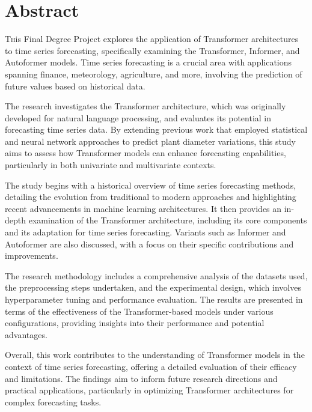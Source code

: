 

\chapter*{Abstract}
\pagestyle{especial}
{}

\lettrine[lraise=-0.1, lines=2, loversize=0.2]{T}{h}is Final Degree Project explores the application of Transformer architectures to time series forecasting, specifically examining the Transformer, Informer, and Autoformer models. Time series forecasting is a crucial area with applications spanning finance, meteorology, agriculture, and more, involving the prediction of future values based on historical data.

The research investigates the Transformer architecture, which was originally developed for natural language processing, and evaluates its potential in forecasting time series data. By extending previous work that employed statistical and neural network approaches to predict plant diameter variations, this study aims to assess how Transformer models can enhance forecasting capabilities, particularly in both univariate and multivariate contexts.

The study begins with a historical overview of time series forecasting methods, detailing the evolution from traditional to modern approaches and highlighting recent advancements in machine learning architectures. It then provides an in-depth examination of the Transformer architecture, including its core components and its adaptation for time series forecasting. Variants such as Informer and Autoformer are also discussed, with a focus on their specific contributions and improvements.

The research methodology includes a comprehensive analysis of the datasets used, the preprocessing steps undertaken, and the experimental design, which involves hyperparameter tuning and performance evaluation. The results are presented in terms of the effectiveness of the Transformer-based models under various configurations, providing insights into their performance and potential advantages.

Overall, this work contributes to the understanding of Transformer models in the context of time series forecasting, offering a detailed evaluation of their efficacy and limitations. The findings aim to inform future research directions and practical applications, particularly in optimizing Transformer architectures for complex forecasting tasks.

